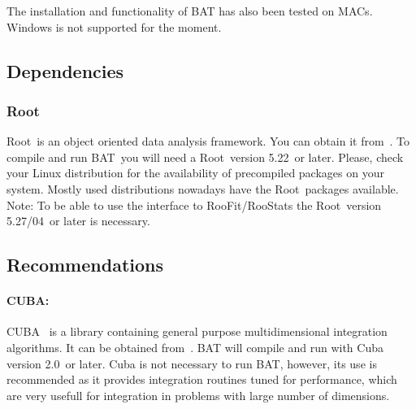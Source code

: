 \documentclass[11pt, a4paper]{article}
\newcommand{\bat}{{\sc BAT}}
\newcommand{\Root}{{\sc Root}}
\newcommand{\RootVersion}{5.22}
\newcommand{\RooStatsVersion}{5.27/04}
\newcommand{\CubaVersion}{2.0}
\begin{document}
\noindent
The installation and functionality of BAT has also been tested on MACs. \\

\noindent
Windows is not supported for the moment.


\subsection{Dependencies}

\subsubsection{\Root}
\Root\ is an object oriented data analysis framework. You can obtain it
from~\cite{ROOTweb}. To compile and run \bat\ you will need a \Root\
version \RootVersion\ or later. Please, check your Linux distribution for the
availability of precompiled packages on your system. Mostly used
distributions nowadays have the \Root\ packages available. \\

\noindent
Note: To be able to use the interface to RooFit/RooStats the \Root\
version \RooStatsVersion\ or later is necessary.


\subsection{Recommendations}

\enlargethispage{1cm}

\paragraph{CUBA:}
CUBA~\cite{CUBA} is a library containing general purpose
multidimensional integration algorithms. It can be obtained
from~\cite{CUBAweb}. BAT will compile and run with Cuba version
\CubaVersion\ or later. Cuba is not necessary to run BAT, however, its
use is recommended as it provides integration routines tuned for
performance, which are very usefull for integration in problems with
large number of dimensions.
\end{document}
